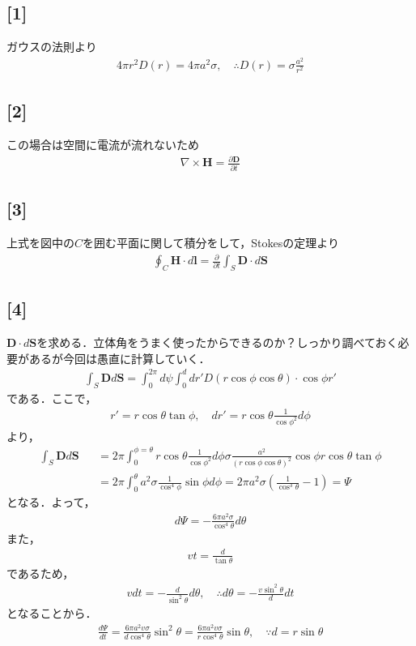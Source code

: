 \documentclass[12pt,dvipdfmx]{jsarticle}
\begin{document}
\subsection*{\large{[1]}}
ガウスの法則より
\begin{eqnarray}
  4\pi r^2 D(r) = 4\pi a^2 \sigma ,\quad\therefore D(r) = \sigma\frac{a^2}{r^2}
\end{eqnarray}
\subsection*{\large{[2]}}
この場合は空間に電流が流れないため
\begin{eqnarray}
  \nabla\times \bm{H} = \frac{\partial\bm{D}}{\partial t}
\end{eqnarray}
\subsection*{\large{[3]}}
上式を図中の$C$を囲む平面に関して積分をして，Stokesの定理より
\begin{eqnarray}
  \oint_C \bm{H}\cdot d\bm{l} = \frac{\partial}{\partial t} \int_S \bm{D}\cdot d\bm{S}
\end{eqnarray}
\subsection*{\large{[4]}}
$\bm{D}\cdot d\bm{S}$を求める．立体角をうまく使ったからできるのか？しっかり調べておく必要があるが今回は愚直に計算していく．
\begin{eqnarray}
  \int_S \bm{D}d\bm{S} = \int_0^{2\pi}d\psi \int_{0}^{d}dr' D(r\cos\phi\cos\theta)\cdot \cos\phi r'
\end{eqnarray}
である．ここで，
\begin{eqnarray}
  r' = r\cos\theta \tan\phi,\quad dr' = r\cos\theta \frac{1}{\cos\phi^2}d\phi
\end{eqnarray}
より，
\begin{eqnarray}
  \int_S \bm{D}d\bm{S} &&= 2\pi \int_{0}^{\phi=\theta}  r\cos\theta \frac{1}{\cos\phi^2}d\phi \sigma\frac{a^2}{(r\cos\phi\cos\theta)^2} \cos\phi  r\cos\theta \tan\phi\\
  &&=2\pi\int_0^{\theta} a^2\sigma \frac{1}{\cos^4\phi}\sin\phi d\phi =2\pi a^2\sigma  \left(\frac{1}{\cos^3\theta}-1\right) = \Psi
\end{eqnarray}
となる．よって，
\begin{eqnarray}
  d\Psi = -\frac{6\pi a^2\sigma}{\cos^4\theta}d\theta
\end{eqnarray}
また，
\begin{eqnarray}
  vt = \frac{d}{\tan\theta}
\end{eqnarray}
であるため，
\begin{eqnarray}
  vdt = -\frac{d}{\sin^2\theta}d\theta,\quad\therefore d\theta = -\frac{v\sin^2\theta}{d}dt
\end{eqnarray}
となることから．
\begin{eqnarray}
  \frac{d\Psi}{d t} = \frac{6\pi a^2 v\sigma}{d\cos^4\theta}\sin^2\theta = \frac{6\pi a^2 v\sigma}{r\cos^4\theta}\sin\theta, \quad\because d = r\sin\theta
\end{eqnarray}
\end{document}
